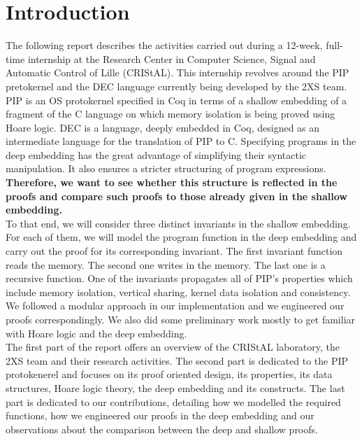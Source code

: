 \chapter{Introduction}
The following report describes the activities carried out during a 12-week, full-time internship at the Research Center in Computer Science, Signal and Automatic Control of Lille (CRIStAL). This internship revolves around the PIP pretokernel and the DEC language currently being developed by the 2XS team. PIP is an OS protokernel specified in Coq in terms of a shallow embedding of a fragment of the C language on which memory isolation is being proved using Hoare logic. DEC is a language, deeply embedded in Coq, designed as an intermediate language for the translation of PIP to C. Specifying programs in the deep embedding has the great advantage of simplifying their syntactic manipulation. It also ensures a stricter structuring of program expressions. \textbf{Therefore, we want to see whether this structure is reflected in the proofs and compare such proofs to those already given in the shallow embedding.}\\ 

To that end, we will consider three distinct invariants in the shallow embedding. For each of them, we will model the program function in the deep embedding and carry out the proof for its corresponding invariant. The first invariant function reads the memory. The second one writes in the memory. The last one is a recursive function. One of the invariants propagates all of PIP's properties which include memory isolation, vertical sharing, kernel data isolation and consistency. We followed a modular approach in our implementation and we engineered our proofs correspondingly. We also did some preliminary work mostly to get familiar with Hoare logic and the deep embedding. \\

The first part of the report offers an overview of the CRIStAL laboratory, the 2XS team and their research activities. The second part is dedicated to the PIP protokenerel and focuses on its proof oriented design, its properties, its data structures, Hoare logic theory, the deep embedding and its constructs. The last part is dedicated to our contributions, detailing how we modelled the required functions, how we engineered our proofs in the deep embedding and our observations about the comparison between the deep and shallow proofs.
  



